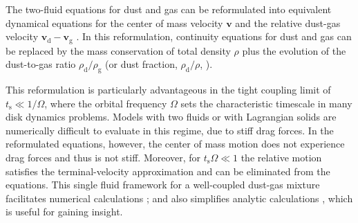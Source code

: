 \documentclass[iop, numberedappendix]{emulateapj}
\newcommand{\rhod}{\rho_\mathrm{d}}
\newcommand{\rhog}{\rho_\mathrm{g}}
\newcommand{\tstop}{t_\mathrm{s}}
\begin{document}


The two-fluid equations for dust and gas can be reformulated into 
equivalent dynamical equations for the center of mass velocity $\bm{v}$
and the relative dust-gas velocity  $\bm{v}_\mathrm{d}-\bm{v}_\mathrm{g}$ 
\citep{youdin05a}. In this reformulation, continuity equations for dust and gas can be replaced 
by the mass conservation of total density $\rho$ plus the evolution of the dust-to-gas ratio $\rhod/\rhog$ 
(or dust fraction, $\rhod/\rho$, \citealp{laibe14}).

This reformulation is particularly advantageous in the tight coupling limit of  $\tstop \ll 1/\Omega$, where the orbital frequency $\Omega$ sets the characteristic timescale in many disk dynamics problems.
Models with two fluids or with Lagrangian solids are numerically difficult to evaluate in this regime, due to stiff drag forces.  
In the reformulated equations, however, the center of mass motion does
not experience drag forces and thus is not stiff.  Moreover,
for $\tstop\Omega\ll 1$ the relative motion satisfies the terminal-velocity approximation and can be eliminated from the equations.  This single fluid framework for a well-coupled dust-gas mixture facilitates numerical calculations \citep{price15}; and also simplifies analytic calculations \citep{youdin05a,jacquet11}, which is useful for gaining insight.  

%
\end{document}
